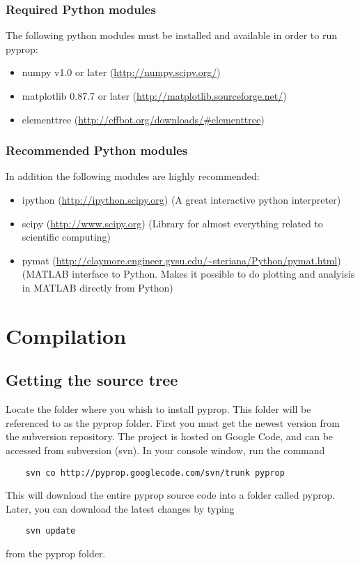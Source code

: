 \subsubsection*{Required Python modules}
The following python modules must be installed and available in order to run pyprop:
\begin{itemize}
\item numpy v1.0 or later (\url{http://numpy.scipy.org/})
\item matplotlib 0.87.7 or later (\url{http://matplotlib.sourceforge.net/})
\item elementtree (\url{http://effbot.org/downloads/\#elementtree})
\end{itemize}
	
\subsubsection*{Recommended Python modules}
In addition the following modules are highly recommended:
\begin{itemize}
\item ipython (\url{http://ipython.scipy.org}) (A great interactive python interpreter)
\item scipy (\url{http://www.scipy.org}) (Library for almost everything related to scientific computing)
\item pymat (\url{http://claymore.engineer.gvsu.edu/~steriana/Python/pymat.html}) (MATLAB interface to Python. 
	Makes it possible to do plotting and analyisis in MATLAB directly from Python)
\end{itemize}

\section{Compilation}
\subsection*{Getting the source tree}
Locate the folder where you whish to install pyprop. This folder will be referenced to as the pyprop folder.
First you must get the newest version from the subversion repository. The project is hosted on Google Code, and 
can be accessed from subversion (svn). In your console window, run the command
\begin{verbatim}
	svn co http://pyprop.googlecode.com/svn/trunk pyprop
\end{verbatim}
This will download the entire pyprop source code into a folder called pyprop. Later, you can download the latest
changes by typing
\begin{verbatim}
	svn update
\end{verbatim}
from the pyprop folder.



